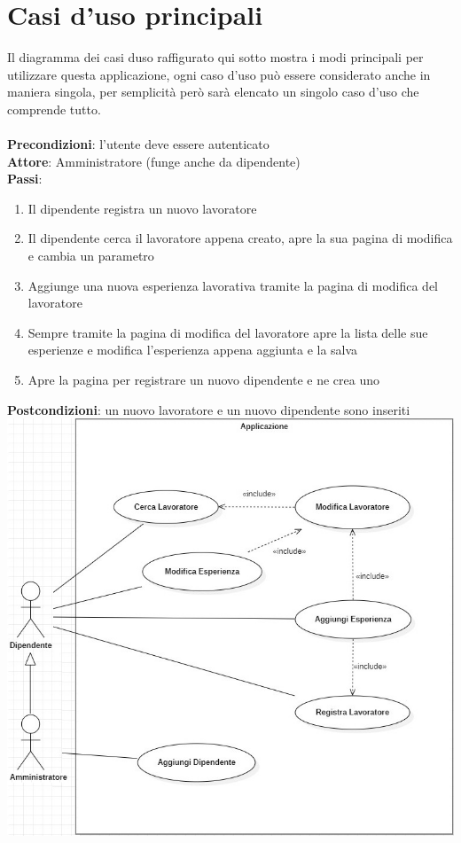 \documentclass[ 4paper,11pt,openany]{book}
\begin{document}
\section{Casi d'uso principali}
Il diagramma dei casi duso raffigurato qui sotto mostra i modi principali per utilizzare questa applicazione, ogni caso d'uso può essere considerato anche in maniera singola, per semplicità però sarà elencato un singolo caso d'uso che comprende tutto.\\\\
\textbf{Precondizioni}: l'utente deve essere autenticato\\
\textbf{Attore}: Amministratore (funge anche da dipendente)\\
\textbf{Passi}:
\begin{enumerate}
\item Il dipendente registra un nuovo lavoratore
\item Il dipendente cerca il lavoratore appena creato, apre la sua pagina di modifica e cambia un parametro 
\item Aggiunge una nuova esperienza lavorativa tramite la pagina di modifica del lavoratore
\item Sempre tramite la pagina di modifica del lavoratore apre la lista delle sue esperienze e modifica l'esperienza appena aggiunta e la salva
\item Apre la pagina per registrare un nuovo dipendente e ne crea uno
\end{enumerate}
\textbf{Postcondizioni}: un nuovo lavoratore e un nuovo dipendente sono inseriti\\
\advance\leftskip-0.5cm
\includegraphics[width=180mm]{casi.jpg}
\end{document}
